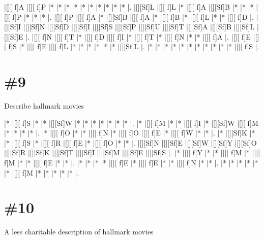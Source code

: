 \documentclass[letterpaper]{article}
\begin{document}
\vspace*{1em}
\begin{Puzzle}{12}{7}
|[][ f]A  |[][ f]P  |*        |*        |*        |*        |*        |*        |*        |*        |*        |*        |.  
|[][Sf]L  |[][ f]L  |*        |[][ f]A  |[][Sf]B  |*        |*        |*        |[][ f]P  |*        |*        |*        |.
|[][ f]P  |[][ f]A  |*        |[][Sf]B  |[][ f]A  |*        |[][ f]B  |*        |[][ f]L  |*        |*        |[][ f]D  |.  
|[][Sf]I  |[][Sf]N  |[][Sf]D  |[][Sf]I  |[][Sf]S  |[][Sf]P  |[][Sf]U  |[][Sf]T  |[][Sf]A  |[][Sf]B  |[][Sf]L  |[][Sf]E  |.
|[][ f]N  |[][ f]T  |*        |[][ f]D  |[][ f]I  |*        |[][ f]T  |*        |[][ f]N  |*        |*        |[][ f]A  |. 
|[][ f]E  |[][ f]S  |*        |[][ f]E  |[][ f]L  |*        |*        |*        |*        |*        |*        |[][Sf]L  |.
|*        |*        |*        |*        |*        |*        |*        |*        |*        |*        |*        |[][ f]S  |.
\end{Puzzle}

\section*{\#9}
Describe hallmark movies

\vspace*{1em}
\begin{Puzzle}{12}{8}
|*        |[][ f]S  |*        |*        |[][Sf]W  |*        |*        |*        |*        |*        |*        |*        |.
|*        |[][ f]M  |*        |*        |[][ f]I  |*        |[][Sf]W  |[][ f]M  |*        |*        |*        |*        |.
|*        |[][ f]O  |*        |*        |[][ f]N  |*        |[][ f]O  |[][ f]E  |*        |[][ f]W  |*        |*        |.
|*        |[][Sf]K  |*        |*        |[][ f]S  |*        |[][ f]R  |[][ f]E  |*        |[][ f]O  |*        |*        |.
|[][Sf]N  |[][Sf]E  |[][Sf]W  |[][Sf]Y  |[][Sf]O  |[][Sf]R  |[][Sf]K  |[][Sf]T  |[][Sf]I  |[][Sf]M  |[][Sf]E  |[][Sf]S  |.
|*        |[][ f]Y  |*        |*        |[][ f]M  |*        |[][ f]M  |*        |*        |[][ f]E  |*        |*        |.
|*        |*        |*        |*        |[][ f]E  |*        |[][ f]E  |*        |*        |[][ f]N  |*        |*        |.
|*        |*        |*        |*        |*        |*        |[][ f]M  |*        |*        |*        |*        |*        |.
\end{Puzzle}

\section*{\#10}
A less charitable description of hallmark movies
\end{document}
